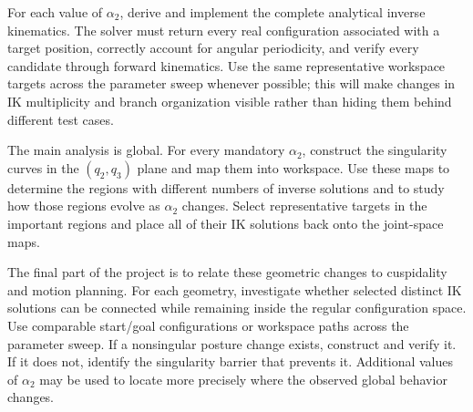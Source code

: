 \documentclass[11pt,a4paper]{article}
\begin{document}
For each value of $\alpha_2$, derive and implement the complete analytical inverse kinematics. The solver must return every real configuration associated with a target position, correctly account for angular periodicity, and verify every candidate through forward kinematics. Use the same representative workspace targets across the parameter sweep whenever possible; this will make changes in IK multiplicity and branch organization visible rather than hiding them behind different test cases.

The main analysis is global. For every mandatory $\alpha_2$, construct the singularity curves in the $(q_2,q_3)$ plane and map them into workspace. Use these maps to determine the regions with different numbers of inverse solutions and to study how those regions evolve as $\alpha_2$ changes. Select representative targets in the important regions and place all of their IK solutions back onto the joint-space maps.

The final part of the project is to relate these geometric changes to cuspidality and motion planning. For each geometry, investigate whether selected distinct IK solutions can be connected while remaining inside the regular configuration space. Use comparable start/goal configurations or workspace paths across the parameter sweep. If a nonsingular posture change exists, construct and verify it. If it does not, identify the singularity barrier that prevents it. Additional values of $\alpha_2$ may be used to locate more precisely where the observed global behavior changes.
\end{document}
